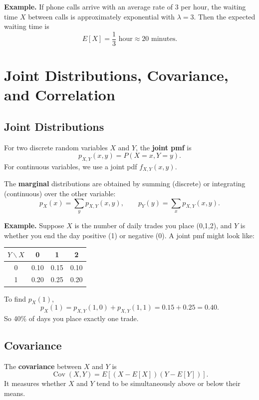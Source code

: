 \documentclass[11pt,a4paper]{article}
\begin{document}
\textbf{Example.}  
If phone calls arrive with an average rate of 3 per hour, the waiting time \(X\) between calls is approximately exponential with \(\lambda=3\).  
Then the expected waiting time is
\[
E[X] = \frac{1}{3} \text{ hour} \approx 20 \text{ minutes}.
\]

\newpage

\section{Joint Distributions, Covariance, and Correlation}

\subsection{Joint Distributions}

For two discrete random variables \(X\) and \(Y\), the \textbf{joint pmf} is
\[
p_{X,Y}(x,y) = P(X=x, Y=y).
\]
For continuous variables, we use a joint pdf \(f_{X,Y}(x,y)\).

The \textbf{marginal} distributions are obtained by summing (discrete) or integrating (continuous) over the other variable:
\[
p_X(x) = \sum_{y} p_{X,Y}(x,y),\qquad
p_Y(y) = \sum_{x} p_{X,Y}(x,y).
\]

\textbf{Example.}  
Suppose \(X\) is the number of daily trades you place (0,1,2), and \(Y\) is whether you end the day positive (1) or negative (0).  
A joint pmf might look like:

\begin{center}
\begin{tabular}{c|ccc}
\toprule
\(Y \backslash X\) & 0 & 1 & 2 \\
\midrule
0 & 0.10 & 0.15 & 0.10 \\
1 & 0.20 & 0.25 & 0.20 \\
\bottomrule
\end{tabular}
\end{center}

To find \(p_X(1)\),
\[
p_X(1) = p_{X,Y}(1,0) + p_{X,Y}(1,1) = 0.15 + 0.25 = 0.40.
\]
So 40\% of days you place exactly one trade.

\subsection{Covariance}

The \textbf{covariance} between \(X\) and \(Y\) is
\[
\operatorname{Cov}(X,Y) = E[(X - E[X])(Y - E[Y])].
\]
It measures whether \(X\) and \(Y\) tend to be simultaneously above or below their means.
\end{document}

